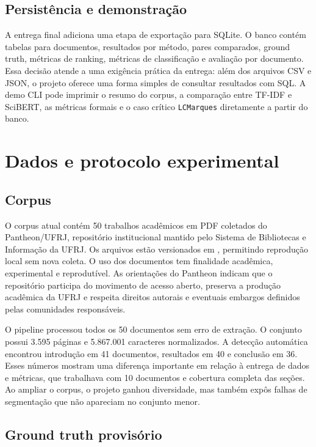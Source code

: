 \documentclass[12pt]{article}
\begin{document}
\subsection{Persistência e demonstração}

A entrega final adiciona uma etapa de exportação para SQLite. O banco  contém tabelas para documentos, resultados por método, pares comparados, ground truth, métricas de ranking, métricas de classificação e avaliação por documento. Essa decisão atende a uma exigência prática da entrega: além dos arquivos CSV e JSON, o projeto oferece uma forma simples de consultar resultados com SQL. A demo CLI pode imprimir o resumo do corpus, a comparação entre TF-IDF e SciBERT, as métricas formais e o caso crítico \texttt{LCMarques} diretamente a partir do banco.

\section{Dados e protocolo experimental}

\subsection{Corpus}

O corpus atual contém 50 trabalhos acadêmicos em PDF coletados do Pantheon/UFRJ, repositório institucional mantido pelo Sistema de Bibliotecas e Informação da UFRJ. Os arquivos estão versionados em , permitindo reprodução local sem nova coleta. O uso dos documentos tem finalidade acadêmica, experimental e reprodutível. As orientações do Pantheon indicam que o repositório participa do movimento de acesso aberto, preserva a produção acadêmica da UFRJ e respeita direitos autorais e eventuais embargos definidos pelas comunidades responsáveis.

O pipeline processou todos os 50 documentos sem erro de extração. O conjunto possui 3.595 páginas e 5.867.001 caracteres normalizados. A detecção automática encontrou introdução em 41 documentos, resultados em 40 e conclusão em 36. Esses números mostram uma diferença importante em relação à entrega de dados e métricas, que trabalhava com 10 documentos e cobertura completa das seções. Ao ampliar o corpus, o projeto ganhou diversidade, mas também expôs falhas de segmentação que não apareciam no conjunto menor.

\subsection{Ground truth provisório}
\end{document}
